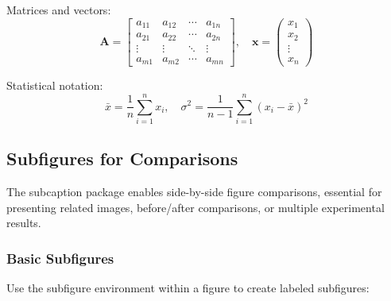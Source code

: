 Matrices and vectors:
\begin{equation}
    \mathbf{A} = \begin{bmatrix}
        a_{11} & a_{12} & \cdots & a_{1n} \\
        a_{21} & a_{22} & \cdots & a_{2n} \\
        \vdots & \vdots & \ddots & \vdots \\
        a_{m1} & a_{m2} & \cdots & a_{mn}
    \end{bmatrix}, \quad
    \mathbf{x} = \begin{pmatrix}
        x_1    \\
        x_2    \\
        \vdots \\
        x_n
    \end{pmatrix}
\end{equation}

Statistical notation:
\begin{equation}
    \bar{x} = \frac{1}{n}\sum_{i=1}^{n} x_i, \quad \sigma^2 = \frac{1}{n-1}\sum_{i=1}^{n} (x_i - \bar{x})^2
\end{equation}

\subsection{Subfigures for Comparisons}

The subcaption package enables side-by-side figure comparisons, essential for presenting related images, before/after comparisons, or multiple experimental results.

\subsubsection{Basic Subfigures}

Use the subfigure environment within a figure to create labeled subfigures:

